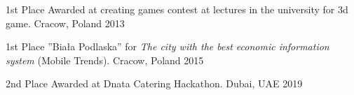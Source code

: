 




\begin{cvhonors}

  \cvhonor
    {1st Place} %
    {Awarded at creating games contest at lectures in the university for 3d game.} %
    {Cracow, Poland} %
    {2013} %

  \cvhonor
    {1st Place} %
    {''Biała Podlaska'' for \textit{The city with the best economic information system} (Mobile Trends).} %
    {Cracow, Poland} %
    {2015} %


\cvhonor
    {2nd Place} %
    {Awarded at Dnata Catering Hackathon. } %
    {Dubai, UAE} %
    {2019} %

\end{cvhonors}
